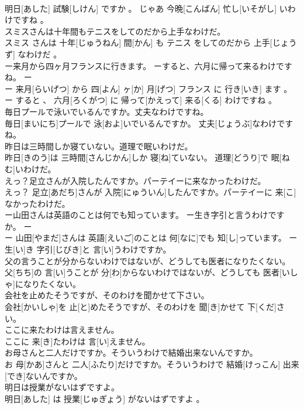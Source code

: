 \documentclass[8pt]{extreport}
\begin{document}
\begin{CJK}{UTF8}{min}
\\	明日[あした] 試験[しけん] ですか 。 じゃあ 今晩[こんばん] 忙し[いそがし] いわけですね 。
\\	スミスさんは十年間もテニスをしてのだから上手なわけだ。	
\\	スミス さんは 十年[じゅうねん] 間[かん] も テニス をしてのだから 上手[じょうず] なわけだ 。
\\	ー来月から四ヶ月フランスに行きます。 ーすると、六月に帰って来るわけですね。	ー
\\	ー 来月[らいげつ] から 四[よん] ヶ[か] 月[げつ] フランス に 行き[いき] ます 。 ー すると 、 六月[ろくがつ] に 帰って[かえって] 来る[くる] わけですね 。
\\	毎日プールで泳いでいるんですか。丈夫なわけですね。	
\\	毎日[まいにち]プールで 泳[およ]いでいるんですか。 丈夫[じょうぶ]なわけですね。
\\	昨日は三時間しか寝ていない。道理で眠いわけだ。	
\\	昨日[きのう]は 三時間[さんじかん]しか 寝[ね]ていない。 道理[どうり]で 眠[ねむ]いわけだ。
\\	えっ？足立さんが入院したんですか。パーテイーに来なかったわけだ。	
\\	えっ？ 足立[あだち]さんが 入院[にゅういん]したんですか。パーテイーに 来[こ]なかったわけだ。
\\	ー山田さんは英語のことは何でも知っています。 ー生き字引と言うわけですか。	ー
\\	ー 山田[やまだ]さんは 英語[えいご]のことは 何[なに]でも 知[し]っています。 ー 生[い]き 字引[じびき]と 言[い]うわけですか。
\\	父の言うことが分からないわけではないが、どうしても医者になりたくない。	
\\	父[ちち]の 言[い]うことが 分[わ]からないわけではないが、どうしても 医者[いしゃ]になりたくない。
\\	会社を止めたそうですが、そのわけを聞かせて下さい。	
\\	会社[かいしゃ]を 止[と]めたそうですが、そのわけを 聞[き]かせて 下[くだ]さい。
\\	ここに来たわけは言えません。	
\\	ここに 来[き]たわけは 言[い]えません。
\\	お母さんと二人だけですか。そういうわけで結婚出来ないんですか。	
\\	お 母[かあ]さんと 二人[ふたり]だけですか。そういうわけで 結婚[けっこん] 出来[でき]ないんですか。
\\	明日は授業がないはずですよ。	
\\	明日[あした] は 授業[じゅぎょう] がないはずですよ 。

\end{CJK}
\end{document}
